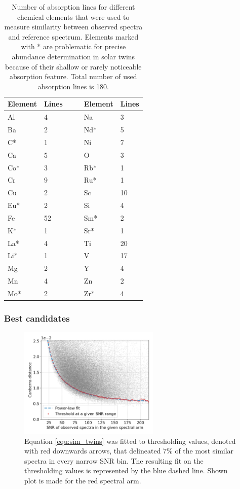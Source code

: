 \begin{table}
	\centering
	\caption{Number of absorption lines for different chemical elements that were used to measure similarity between observed spectra and reference spectrum. Elements marked with * are problematic for precise abundance determination in solar twins because of their shallow or rarely noticeable absorption feature. Total number of used absorption lines is 180.}
	\begin{tabular}{l l c | c l l }
		\hline
		Element & Lines & & & Element & Lines\\ 
		\hline
		Al & 4 & & & Na & 3\\ 
		Ba & 2 & & & Nd* & 5\\ 
		C* & 1 & & & Ni & 7\\ 
		Ca & 5 & & & O & 3 \\ 
		Co* & 3 & & & Rb* & 1\\ 
		Cr & 9 & & & Ru* & 1\\ 
		Cu & 2 & & & Sc & 10\\ 
		Eu* & 2 & & & Si & 4\\ 
		Fe & 52 & & & Sm* & 2\\ 
		K* & 1 & & & Sr* & 1\\ 
		La* & 4 & & & Ti & 20\\ 
		Li* & 1 & & & V & 17\\ 
		Mg & 2 & & & Y & 4\\ 
		Mn & 4 & & & Zn & 2\\ 
		Mo* & 2 & & & Zr* & 4 \\ 
		\hline
	\end{tabular}
	\label{tab:elements_list}
\end{table}

\subsubsection{Best candidates}
\begin{figure}
	\centering
	\includegraphics[width=0.6\textwidth]{canberra_b3_07_envelope.png}
	\caption{Equation \ref{equ:sim_twins} was fitted to thresholding values, denoted with red downwards arrows, that delineated 7\% of the most similar spectra in every narrow SNR bin. The resulting fit on the thresholding values is represented by the blue dashed line. Shown plot is made for the red spectral arm.}
	\label{fig:envelope_fit_twins}
\end{figure}

